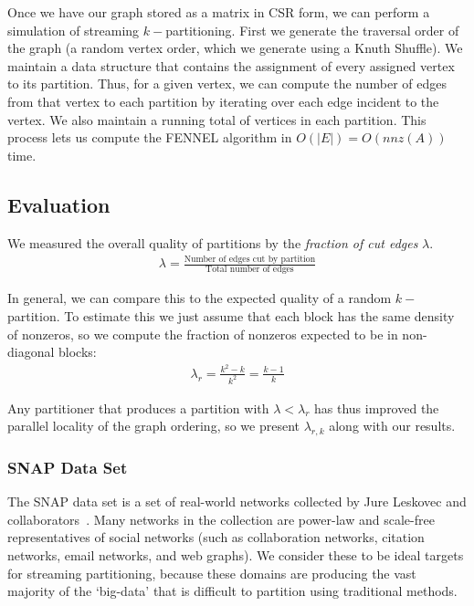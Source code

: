 \documentclass[11pt]{article}
\begin{document}
Once we have our graph stored as a matrix in CSR form, we can perform a simulation of streaming $k-$partitioning. First we generate the traversal order of the graph (a random vertex order, which we generate using a Knuth Shuffle). We maintain a data structure that contains the assignment of every assigned vertex to its partition. Thus, for a given vertex, we can compute the number of edges from that vertex to each partition by iterating over each edge incident to the vertex. We also maintain a running total of vertices in each partition. This process lets us compute the FENNEL algorithm in $O(|E|)=O(nnz(A))$ time. 

\subsection{Evaluation}

We measured the overall quality of partitions by the \textit{fraction of cut edges} $\lambda$.
\begin{align}\lambda = \frac{\text{Number of edges cut by partition}}{\text{Total number of edges}}\end{align}

In general, we can compare this to the expected quality of a random $k-$partition. To estimate this we just assume that each block has the same density of nonzeros, so we compute the fraction of nonzeros expected to be in non-diagonal blocks:
\begin{align}\lambda_r = \frac{k^2 - k}{k^2} = \frac{k-1}{k} \end{align}

Any partitioner that produces a partition with $\lambda < \lambda_r$ has thus improved the parallel locality of the graph ordering, so we present $\lambda_{r,k}$ along with our results.

\subsubsection{SNAP Data Set}
The SNAP data set is a set of real-world networks collected by Jure Leskovec and collaborators~\cite{Leskovec-data}. Many networks in the collection are power-law and scale-free representatives of social networks (such as collaboration networks, citation networks, email networks, and web graphs). We consider these to be ideal targets for streaming partitioning, because these domains are producing the vast majority of the `big-data' that is difficult to partition using traditional methods. 
\end{document}
